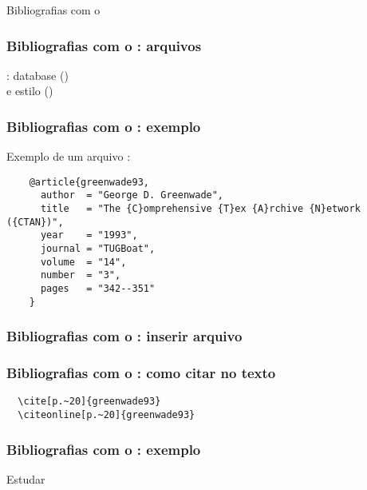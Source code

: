 \begin{frame}[standout]
  \Huge
  Bibliografias com o 
\end{frame}

\begin{frame}
  \frametitle{Bibliografias com o : arquivos}
  \LARGE
  : database ()\\
  e estilo ()
\end{frame}

\begin{frame}[fragile]
  \frametitle{Bibliografias com o : exemplo}
  \LARGE
  Exemplo de um arquivo :
  \vspace{1em}

  \begin{verbatim}
    @article{greenwade93,
      author  = "George D. Greenwade",
      title   = "The {C}omprehensive {T}ex {A}rchive {N}etwork ({CTAN})",
      year    = "1993",
      journal = "TUGBoat",
      volume  = "14",
      number  = "3",
      pages   = "342--351"
    }
  \end{verbatim}
\end{frame}

\begin{frame}[fragile]
  \frametitle{Bibliografias com o : inserir arquivo }
  \LARGE
  \texttt{}
\end{frame}

\begin{frame}[fragile]
  \frametitle{Bibliografias com o : como citar no texto}
  \begin{verbatim}
  \cite[p.~20]{greenwade93}
  \citeonline[p.~20]{greenwade93}
  \end{verbatim}
\end{frame}

\begin{frame}
  \frametitle{Bibliografias com o : exemplo}
  \huge
  Estudar 
\end{frame}
